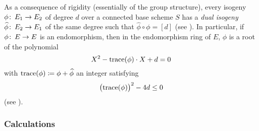 \documentclass{gtpart}
\theoremstyle{definition}
\theoremstyle{remark}
\def\co{\colon\thinspace}
\newcommand{\Hphi}{\widehat{\phi}}
\newcommand{\tr}{{\rm trace}}
\newcommand{\ce}{\coloneqq}
\numberwithin{equation}{section}
\numberwithin{thm}{section}
\begin{document}
As a consequence of rigidity (essentially of the group structure), every 
isogeny $\phi \co E_1 \to E_2$ of degree $d$ over a connected base 
scheme $S$ has a {\em dual isogeny} $\Hphi \co E_2 \to E_1$ of the same 
degree such that $\Hphi \circ \phi = [d]$ (see \cite[2.6.1]{KM}).  In 
particular, if $\phi \co E \to E$ is an endomorphism, then in the 
endomorphism ring of $E$, $\phi$ is a root of the polynomial 
\begin{equation}
\label{poly}
 X^2 - \tr(\phi) \cdot X + d = 0 
\end{equation}
with $\tr(\phi) \ce \phi + \Hphi$ an integer satisfying 
\[
 \big( \tr(\phi) \big)^2 - 4 d \leq 0 
\]
(see \cite[2.6.2.2 and 2.6.3]{KM}).  

\subsubsection*{Calculations}
\end{document}
